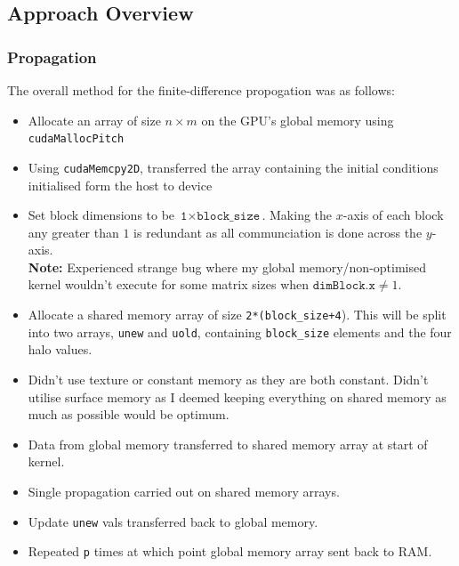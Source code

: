 \documentclass[12pt]{article}
\begin{document}
\subsection*{Approach Overview}
\subsubsection*{Propagation}
	The overall method for the finite-difference propogation was as follows:
	\begin{itemize}
	\item Allocate an array of size $n\times m$ on the GPU's global memory using \texttt{cudaMallocPitch}
	\item Using \texttt{cudaMemcpy2D}, transferred the array containing the initial conditions initialised form the host to device
	\item Set block dimensions to be $\texttt{1}\times\texttt{block\_size}$. Making the $x$-axis of each block any greater than $1$ is redundant as all communciation is done across the $y$-axis.\\
	\textbf{Note:} Experienced strange bug where my global memory/non-optimised  kernel wouldn't execute for some matrix sizes when $\texttt{dimBlock.x} \neq 1$.
	\item Allocate a shared memory array of size \texttt{2*(block\_size+4}). This will be split into two arrays, \texttt{unew} and \texttt{uold}, containing \texttt{block\_size} elements and the four halo values.
	\item Didn't use texture or constant memory as they are both constant. Didn't utilise surface memory as I deemed keeping everything on shared memory as much as possible would be optimum.
	\item Data from global memory transferred to shared memory array at start of kernel.
	\item Single propagation carried out on shared memory arrays.
	\item Update \texttt{unew} vals transferred back to global memory.
	\item Repeated \texttt{p} times at which point global memory array sent back to RAM. 
	\end{itemize}
\end{document}
